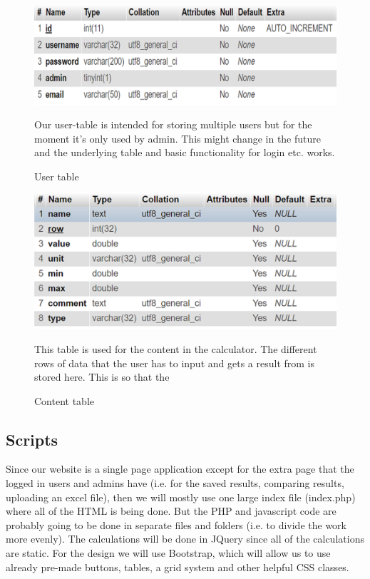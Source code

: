 \documentclass[]{article}
\begin{document}
\begin{figure}[H]
	\includegraphics[width=1.0\linewidth]{Bild8}
	\caption{User table}
	\medskip
	\small
	Our user-table is intended for storing multiple users but for the moment it's only used by admin. This might change in the future and the underlying table and basic functionality for login etc. works.
	\label{fig:Bild8}
\end{figure}

\begin{figure}[H]
	\includegraphics[width=1.0\linewidth]{Bild9}
	\caption{Content table}
	\medskip
	\small
	This table is used for the content in the calculator. The different rows of data that the user has to input and gets a result from is stored here. This is so that the 
	\label{fig:Bild9}
\end{figure}

\subsection{Scripts}
Since our website is a single page application except for the extra page that the
logged in users and admins have (i.e. for the saved results, comparing results,
uploading an excel file), then we will mostly use one large index file (index.php) where all of the HTML is being done. But the PHP and javascript code are probably going to be done in separate files and folders (i.e. to divide the work more evenly). The calculations will be done in JQuery since all of the calculations are static. For the design we will use Bootstrap, which will allow us to use already pre-made buttons, tables, a grid system and other helpful CSS classes. 
\end{document}
